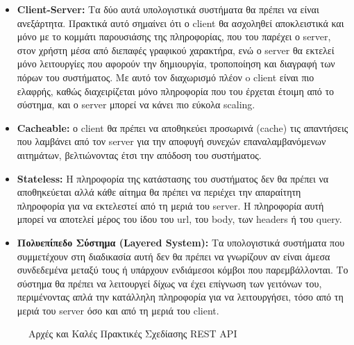 \begin{itemize}
	\item \textbf{Client-Server:} Τα δύο αυτά υπολογιστικά συστήματα θα πρέπει να είναι ανεξάρτητα.
		Πρακτικά αυτό σημαίνει ότι ο client θα ασχοληθεί αποκλειστικά και μόνο με το κομμάτι παρουσιάσης της πληροφορίας, που του παρέχει ο server,
		στον χρήστη μέσα από διεπαφές γραφικού χαρακτήρα, ενώ ο server θα εκτελεί μόνο λειτουργίες που αφορούν την δημιουργία, τροποποίηση και διαγραφή των πόρων του
		συστήματος. Με αυτό τον διαχωρισμό πλέον o client είναι πιο ελαφρής, καθώς διαχειρίζεται μόνο πληροφορία που του έρχεται έτοιμη από το σύστημα,
		και ο server μπορεί να κάνει πιο εύκολα scaling.
	\item \textbf{Cacheable:} ο client θα πρέπει να αποθηκεύει προσωρινά (cache) τις
		απαντήσεις που λαμβάνει από τον server για την αποφυγή συνεχών επαναλαμβανόμενων αιτημάτων, βελτιώνοντας
		έτσι την απόδοση του συστήματος.
	\item \textbf{Stateless:} Η πληροφορία της κατάστασης του συστήματος δεν θα πρέπει να αποθηκεύεται
		αλλά κάθε αίτημα θα πρέπει να περιέχει την απαραίτητη πληροφορία για να εκτελεστεί από τη μεριά του server.
		Η πληροφορία αυτή μπορεί να αποτελεί μέρος του ίδου του url, του body, των headers ή του query.
	\item \textbf{Πολυεπίπεδο Σύστημα (Layered System):} Τα υπολογιστικά συστήματα που συμμετέχουν στη διαδικασία αυτή δεν
		θα πρέπει να γνωρίζουν αν είναι άμεσα συνδεδεμένα μεταξύ τους ή υπάρχουν ενδιάμεσοι κόμβοι που παρεμβάλλονται.
		Το σύστημα θα πρέπει να λειτουργεί δίχως να έχει επίγνωση των γειτόνων του, περιμένοντας απλά την κατάλληλη πληροφορία για να
		λειτουργήσει, τόσο από τη μεριά του server όσο και από τη μεριά του client.
\end{itemize}

\begin{figure}[!ht]
	\centering
	\caption[Αρχές και Καλές Πρακτικές Σχεδίασης REST API]{Αρχές και Καλές Πρακτικές Σχεδίασης REST API}
	\label{fig:rest_principles}
\end{figure}